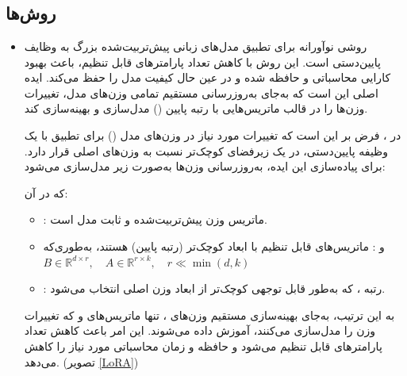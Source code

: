 \documentclass[11pt, a4paper, oneside]{book}
\begin{document}
		\section{}
			
			\subsection{روش‌ها}
			
				\begin{itemize}
					
					\item {\large {}}
						
						روشی نوآورانه برای تطبیق مدل‌های زبانی پیش‌تربیت‌شده بزرگ به وظایف پایین‌دستی است. این روش با کاهش تعداد پارامترهای قابل تنظیم، باعث بهبود کارایی محاسباتی و حافظه شده و در عین حال کیفیت مدل را حفظ می‌کند. ایده اصلی  این است که به‌جای به‌روزرسانی مستقیم تمامی وزن‌های مدل، تغییرات وزن‌ها را در قالب ماتریس‌هایی با رتبه پایین () مدل‌سازی و بهینه‌سازی کند.
						
						در ، فرض بر این است که تغییرات مورد نیاز در وزن‌های مدل () برای تطبیق با یک وظیفه پایین‌دستی، در یک زیرفضای کوچک‌تر نسبت به وزن‌های اصلی قرار دارد. برای پیاده‌سازی این ایده، به‌روزرسانی وزن‌ها به‌صورت زیر مدل‌سازی می‌شود:
						​
						\begin{center}
						\end{center}
						
						که در آن:
						
						\begin{itemize}
							
							\item {}:
							ماتریس وزن پیش‌تربیت‌شده و ثابت مدل است.
							
							
							\item {} و :
							ماتریس‌های قابل تنظیم با ابعاد کوچک‌تر (رتبه پایین) هستند، به‌طوری‌که
							$B \in \mathbb{R}^{d \times r}, \quad A \in \mathbb{R}^{r \times k}, \quad r \ll \min(d, k)$
							
							\item {}:
							رتبه ، که به‌طور قابل توجهی کوچک‌تر از ابعاد وزن اصلی انتخاب می‌شود.
							
						\end{itemize}
						
						به این ترتیب، به‌جای بهینه‌سازی مستقیم وزن‌های 
						، تنها ماتریس‌های 
						 و 
						که تغییرات وزن را مدل‌سازی می‌کنند، آموزش داده می‌شوند. این امر باعث کاهش تعداد پارامترهای قابل تنظیم می‌شود و حافظه و زمان محاسباتی مورد نیاز را کاهش می‌دهد. (تصویر \ref{LoRA})
						

\end{itemize}
\end{document}
